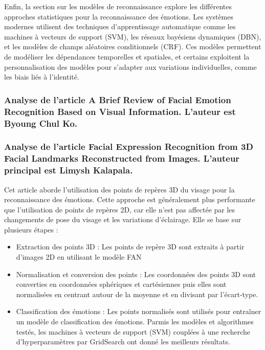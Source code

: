 \documentclass{rapport}
\begin{document}
Enfin, la section sur les modèles de reconnaissance explore les différentes
approches statistiques pour la reconnaissance des émotions. Les systèmes modernes
utilisent des techniques d'apprentissage automatique comme les machines à vecteurs
de support (SVM), les réseaux bayésiens dynamiques (DBN), et les modèles de champs
aléatoires conditionnels (CRF). Ces modèles permettent de modéliser les dépendances
temporelles et spatiales, et certains exploitent la personnalisation des modèles
pour s’adapter aux variations individuelles, comme les biais liés à l'identité.

\subsubsection{Analyse de l'article \cite{koBriefReviewFacial2018} A Brief Review of Facial Emotion Recognition Based on Visual Information. L'auteur est Byoung Chul Ko.}

\subsubsection{Analyse de l'article \cite{kalapalaFacialExpressionRecognition2020} Facial Expression Recognition from 3D Facial  Landmarks Reconstructed from Images. L'auteur principal est Limysh Kalapala.}

Cet article aborde l'utilisation des points de repères 3D du visage pour la reconnaissance des émotions.
Cette approche est généralement plus performante que l'utilisation de points de repères 2D, car elle n'est pas
affectée par les changements de pose du visage et les variations d'éclairage. Elle se base sur plusieurs étapes :\\
\begin{itemize}
    \item Extraction des points 3D : Les points de repère 3D sont extraits à partir d'images 2D en utilisant le modèle FAN
    \item Normalisation et conversion des points : Les coordonnées des points 3D sont converties en coordonnées sphériques et cartésiennes
          puis elles sont normalisées en centrant autour de la moyenne et en divisant par l'écart-type.
    \item Classification des émotions : Les points normalisés sont utilisés pour entraîner un modèle de classification des émotions. Parmis
          les modèles et algorithmes testés, les machines à vecteurs de support (SVM) couplées à une recherche d'hyperparamètres par GridSearch
          ont donné les meilleurs résultats.\\
\end{itemize}
\end{document}
